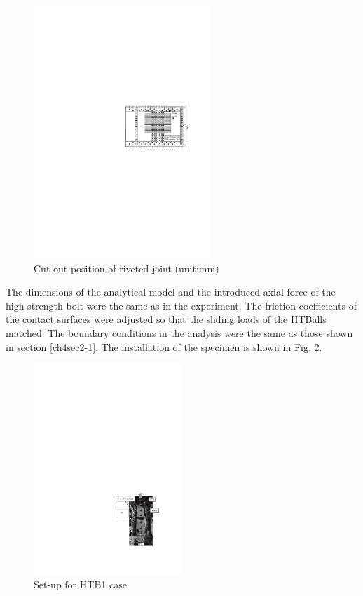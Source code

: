 \begin{figure}[htbp]
    \centering
    \includegraphics[width=0.6\textwidth]{imgs/ch4/figA1.pdf}
    \caption{Cut out position of riveted joint (unit:mm) }
    \label{ch4figA1}
\end{figure}
 
The dimensions of the analytical model and the introduced axial force of the high-strength bolt were the same as in the experiment. The friction coefficients of the contact surfaces were adjusted so that the sliding loads of the HTBalls matched. The boundary conditions in the analysis were the same as those shown in section \ref{ch4sec2-1}. The installation of the specimen is shown in Fig. \ref{ch4figA2}.

\begin{figure}[htbp]
    \centering
    \includegraphics[width=0.5\textwidth]{imgs/ch4/figA2.pdf}
    \caption{Set-up for HTB1 case}
    \label{ch4figA2}
\end{figure}


